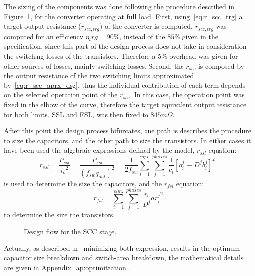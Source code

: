 The sizing of the components was done following the procedure described in Figure~\ref{fig:design_flow_drv}, for the converter operating at full load. First, using~\eqref{eq:r_scc_trg} a target output resistance ($r_{scc,trg}$) of the converter is computed. $r_{scc,trg}$ was computed for an efficiency $\eta_trg = 90\%$, instead of the $85\%$ given in the specification, since this part of the design process does not take in consideration the switching losses of the transistors. Therefore a $5\%$ overhead was given for other sources of losses, mainly switching losses. Second, the $r_{scc}$ is composed by the output resistance of the two switching limits approximated by~\eqref{eq:r_scc_aprx_dsg}, thus the individual contribution of each term depends on the selected operation point of the $r_{scc}$. In this case, the operation point was fixed in the elbow of the curve, therefore the target equivalent output resistance for both limits, SSL and FSL, was then fixed to $845m\Omega$.

After this point the design process bifurcates, one path is describes the procedure to size the capacitors, and the other path to size the transistors. In either cases it have been used the algebraic expressions defined by the model, $r_{ssl}$ equation:
\begin{equation}
r_{ssl}=\frac{P_{ssl}}{{i_o}^2}=\frac{P_{ssl}}{{(f_{sw} {q_{out}})}^2}=\frac{1}{2 f_{sw}}\sum_{i=1}^{caps.}\sum_{j=1}^{phases}\frac{1}{c_i}{\left[a_{i\
}^j-{D^j} {b_i^j}\right]}^2.
\label{eq:r_ssl}
\end{equation}
is used to determine the size the capacitors, and the $r_{fsl}$ equation:
\begin{equation}
r_{fsl}=\sum_{i=1}^{elm.}\sum_{j=1}^{phases}\frac{r_i}{D^j}{ar_i^j}^2
\label{eq:r_fsl}
\end{equation}
to determine the size the transistors.

\begin{landscape}
\thispagestyle{empty}
\begin{figure}[!h]
\centering

\caption[SCC stage design flow]{Design flow for the SCC stage.}
\label{fig:design_flow_drv}
\end{figure}
\end{landscape}
Actually, as described in~\cite{Seeman:EECS-2009-78} minimizing both expression, results in the optimum capacitor size breakdown and switch-area breakdown, the mathematical details are given in Appendix~\ref{ap:optimitzation}.

